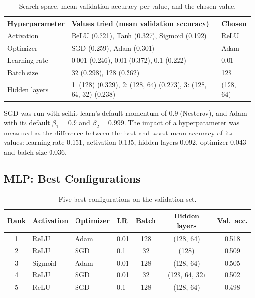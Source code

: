 \documentclass[12pt,a4paper]{article}
\begin{document}
\begin{table}[H]
\centering
\begin{tabular}{lp{7.5cm}l}
\toprule
Hyperparameter & Values tried (mean validation accuracy) & Chosen \\
\midrule
Activation & ReLU (0.321), Tanh (0.327), Sigmoid (0.192) & ReLU \\
Optimizer & SGD (0.259), Adam (0.301) & Adam \\
Learning rate & 0.001 (0.246), 0.01 (0.372), 0.1 (0.222) & 0.01 \\
Batch size & 32 (0.298), 128 (0.262) & 128 \\
Hidden layers & 1: (128) (0.329), 2: (128, 64) (0.273), 3: (128, 64, 32) (0.238) & (128, 64) \\
\bottomrule
\end{tabular}
\caption{Search space, mean validation accuracy per value, and the chosen value.}
\label{tab:grid}
\end{table}

SGD was run with scikit-learn's default momentum of 0.9 (Nesterov), and Adam with its default $\beta_1=0.9$ and $\beta_2=0.999$. The impact of a hyperparameter was measured as the difference between the best and worst mean accuracy of its values: learning rate 0.151, activation 0.135, hidden layers 0.092, optimizer 0.043 and batch size 0.036.

\subsection{MLP: Best Configurations}
\begin{table}[H]
\centering
\begin{tabular}{clllccc}
\toprule
Rank & Activation & Optimizer & LR & Batch & Hidden layers & Val.\ acc. \\
\midrule
1 & ReLU & Adam & 0.01 & 128 & (128, 64) & 0.518 \\
2 & ReLU & SGD & 0.1 & 32 & (128) & 0.509 \\
3 & Sigmoid & Adam & 0.01 & 128 & (128, 64) & 0.505 \\
4 & ReLU & SGD & 0.01 & 32 & (128, 64, 32) & 0.502 \\
5 & ReLU & SGD & 0.1 & 128 & (128, 64) & 0.498 \\
\bottomrule
\end{tabular}
\caption{Five best configurations on the validation set.}
\end{table}
\end{document}
